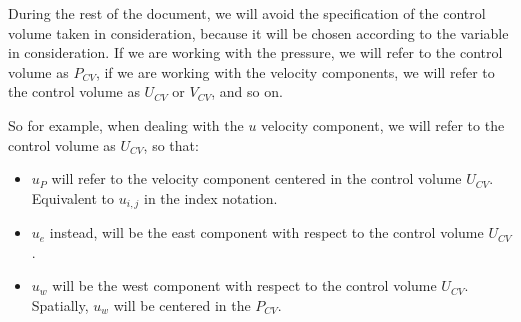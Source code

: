During the rest of the document, we will avoid the specification of the control volume taken in consideration, because it will be chosen according to the variable in consideration.
If we are working with the pressure, we will refer to the control volume as $P_{CV}$, if we are working with the velocity components, we will refer to the control volume as $U_{CV}$ or $V_{CV}$, and so on.

So for example, when dealing with the $u$ velocity component, we will refer to the control volume as $U_{CV}$, so that:

\begin{itemize}
    \item $u_P$ will refer to the velocity component centered in the control volume $U_{CV}$. Equivalent to $u_{i,j}$ in the index notation.
    \item $u_e$ instead, will be the east component with respect to the control volume $U_{CV}$.
    \item $u_w$ will be the west component with respect to the control volume $U_{CV}$. Spatially, $u_w$ will be centered in the $P_{CV}$.
\end{itemize}


